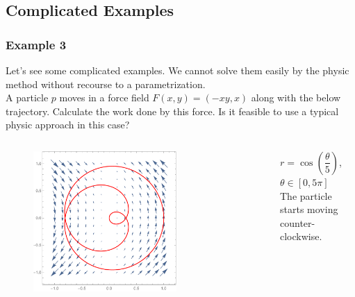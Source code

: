 \documentclass[11pt, t]{beamer}
\newcommand{\nullspace}{~\\[15pt]}
\begin{document}
\subsection{Complicated Examples}
\begin{frame}
    \frametitle{Example 3}
    Let's see some complicated examples. We cannot solve them easily by the physic method without recourse to a parametrization.\nullspace
    A particle $p$ moves in a force field $F(x,y)=(-xy,x)$ along with the below trajectory. Calculate the work done by this force. Is it feasible to use a typical physic approach in this case?
    \begin{columns}
        \begin{figure}[H]
            \centering
            \includegraphics[width=0.7\textwidth]{c1.pdf}
        \end{figure}
        \vspace{1.5cm}

        $r=\cos(\dfrac{\theta}{5})$, $\theta\in[0,5\pi]$\\ \small The particle starts moving counter-clockwise.
    \end{columns}
\end{frame}
\end{document}
